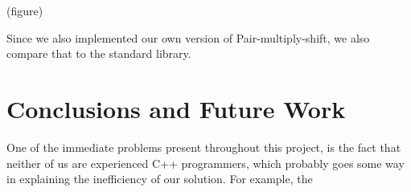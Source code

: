 \documentclass[]{article}
\newcommand{\funk}[1]{\small\texttt{#1}}
\newcommand{\cpp}{C+\!+\xspace}
\begin{document}
(figure)

Since we also implemented our own version of Pair-multiply-shift, we also compare that to the standard library. 

\section{Conclusions and Future Work}

One of the immediate problems present throughout this project, is the fact that neither of us are experienced \cpp programmers, which probably goes some way in explaining the inefficiency of our solution. For example, the

\end{document}
